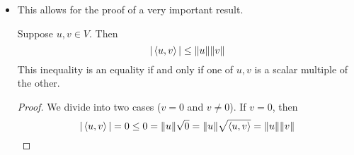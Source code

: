 \documentclass[../main.tex]{subfiles}
\begin{document}
\begin{itemize}
\begin{theorem}
\begin{figure}[h!]
            \caption{An orthogonal decomposition.}
            \label{fig:orthogonalDecomposition}
        \end{figure}
        \begin{proof}
            We want to write $u$ in the form $u=cv+w$ where $w$ is orthogonal to $v$. We know that
            \begin{equation*}
                u=cv+(u-cv)
            \end{equation*}
            so we need only choose $c$ such that $v$ is orthogonal to $u-cv$. In other words, we want
            \begin{align*}
                0 &= \inp{u-cv}{v}\\
                &= \inp{u}{v}+\inp{-cv}{v}\\
                &= \inp{u}{v}-c\inp{v}{v}\\
                &= \inp{u}{v}-c\norm{v}^2\\
                c &= \frac{\inp{u}{v}}{\norm{v}^2}
            \end{align*}
            But this gives the values we want for $c$ and $w$, as desired.
        \end{proof}
    \end{theorem}
    \item This allows for the proof of a very important result.
    \begin{theorem}\label{trm:CauchySchwarz}
        Suppose $u,v\in V$. Then
        \begin{equation*}
            |\left\langle{u},{v}\right\rangle| \leq \norm{u}\norm{v}
        \end{equation*}
        This inequality is an equality if and only if one of $u,v$ is a scalar multiple of the other.
        \begin{proof}
            We divide into two cases ($v=0$ and $v\neq 0$). If $v=0$, then
            \begin{equation*}
                |\inp{u}{v}| = 0 \leq 0 = \norm{u}\sqrt{0} = \norm{u}\sqrt{\inp{u}{v}} = \norm{u}\norm{v}

\end{equation*}
\end{proof}
\end{theorem}
\end{itemize}
\end{document}
